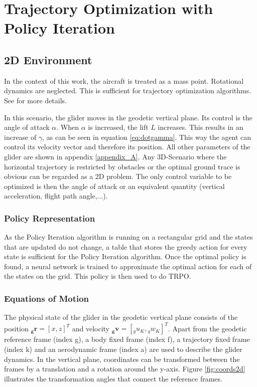 \chapter{Trajectory Optimization with Policy Iteration}

\section{2D Environment}

In the context of this work, the aircraft is treated as a mass point. Rotational dynamics are neglected. This is sufficient for trajectory optimization algorithms. See \cite{Fichter2009} for more details. 


In this scenario, the glider moves in the geodetic vertical plane. Its control is the angle of attack $\alpha$. When $\alpha$ is increased, the lift $L$ increases. This results in an increase of $\gamma$, as can be seen in equation \ref{eq:dotgamma}. This way the agent can control its velocity vector and therefore its position. All other parameters of the glider are shown in appendix \ref{appendix_A}. Any 3D-Scenario where the horizontal trajectory is restricted by obstacles or the optimal ground trace is obvious can be regarded as a 2D problem. The only control variable to be optimized is then the angle of attack or an equivalent quantity (vertical acceleration, flight path angle,...).

\subsection{Policy Representation}

As the Policy Iteration algorithm is running on a rectangular grid and the states that are updated do not change, a table that stores the greedy action for every state is sufficient for the Policy Iteration algorithm. Once the optimal policy is found, a neural network is trained to approximate the optimal action for each of the states on the grid. This policy is then used to do TRPO.

\subsection{Equations of Motion}

The physical state of the glider in the geodetic vertical plane consists of the position $\boldsymbol{{}_g r}=[x,z]^T$ and velocity $\boldsymbol{{}_g v}=[{}_g u_K,{}_g w_K]^T$. Apart from the geodetic reference frame (index g), a body fixed frame (index f), a trajectory fixed frame (index k) and an aerodynamic frame (index a) are used to describe the glider dynamics. In the vertical plane, coordinates can be transformed between the frames by a translation and a rotation around the y-axis. Figure \ref{fig:coords2d} illustrates the transformation angles that connect the reference frames. 

